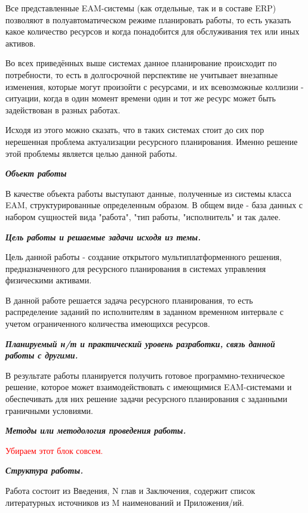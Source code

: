 Все представленные EAM-системы (как отдельные, так и в составе ERP) позволяют в полуавтоматическом режиме планировать работы, то есть указать какое количество ресурсов и когда понадобится для обслуживания тех или иных активов.

Во всех приведённых выше системах данное планирование происходит по потребности, то есть в долгосрочной перспективе не учитывает внезапные изменения, которые могут произойти с ресурсами, и их всевозможные коллизии - ситуации, когда в один момент времени один и тот же ресурс может быть задействован в разных работах.

Исходя из этого можно сказать, что в таких системах стоит до сих пор нерешенная проблема актуализации ресурсного планирования. Именно решение этой проблемы является целью данной работы.

\textbf{\textit{Объект работы}}

В качестве объекта работы выступают данные, полученные из системы класса EAM, структурированные определенным образом. В общем виде - база данных с набором сущностей вида "работа", "тип работы, "исполнитель" и так далее.

\textbf{\textit{Цель работы и решаемые задачи исходя из темы.}}

Цель данной работы - создание открытого мультиплатформенного решения, предназначенного для ресурсного планирования в системах управления физическими активами.

В данной работе решается задача ресурсного планирования, то есть распределение заданий по исполнителям в заданном временном интервале с учетом ограниченного количества имеющихся ресурсов.

\textbf{\textit{Планируемый н/т и практический уровень разработки, связь данной
	работы с другими.}}

В результате работы планируется получить готовое программно-техническое решение, которое может взаимодействовать с имеющимися EAM-системами и обеспечивать для них решение задачи ресурсного планирования с заданными граничными условиями.

\textbf{\textit{Методы или методология проведения работы.}}

\textcolor{red}{Убираем этот блок совсем.}

\textbf{\textit{Структура работы.}}

Работа состоит из Введения, N глав и Заключения, содержит список литературных источников из M наименований и Приложения/ий.

\clearpage
